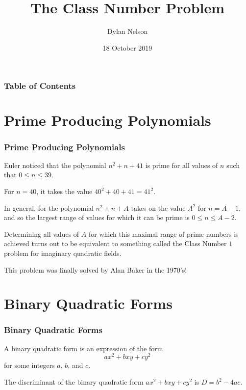 \documentclass{beamer}
\title{The Class Number Problem}
\author{Dylan Nelson}
\institute{Stellenbosch University}
\date{18 October 2019}
\begin{document}
\frame{\titlepage}

\begin{frame}

	\frametitle{Table of Contents}
	\tableofcontents

\end{frame}

\section{Prime Producing Polynomials}

\begin{frame}
	
	\frametitle{Prime Producing Polynomials}

	Euler noticed that the polynomial $n^2 + n + 41$ is prime for all values of $n$ such that $0 \leq n \leq 39$. \pause

	For $n = 40$, it takes the value $40^2 + 40 + 41 = 41^2$. \pause

	In general, for the polynomial $n^2 + n + A$ takes on the value $A^2$ for $n = A - 1$, and so the largest range of values for which it can be prime is $0 \leq n \leq A - 2$. \pause

	Determining all values of $A$ for which this maximal range of prime numbers is achieved turns out to be equivalent to something called the Class Number $1$ problem for imaginary quadratic fields. \pause

	This problem was finally solved by Alan Baker in the 1970's!

\end{frame}

\section{Binary Quadratic Forms}

\begin{frame}

	\frametitle{Binary Quadratic Forms}

	\begin{definition}
		A binary quadratic form is an expression of the form
		\[
			ax^2 + bxy + cy^2
		\]
		for some integers $a$, $b$, and $c$.
	\end{definition}
	\pause

	\begin{definition}[Discriminant]
		The discriminant of the binary quadratic form $ax^2 + bxy + cy^2$ is $D = b^2 - 4ac$.
	\end{definition}

\end{frame}
\end{document}
